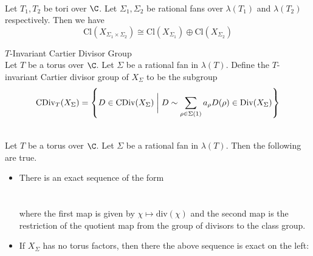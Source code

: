 \documentclass[a4paper]{article}
\begin{document}
\begin{prp}{}{}\\
Let $T_1,T_2$ be tori over $\C$. Let $\Sigma_1,\Sigma_2$ be rational fans over $\lambda(T_1)$ and $\lambda(T_2)$ respectively. Then we have $$\text{Cl}(X_{\Sigma_1\times\Sigma_2})\cong\text{Cl}(X_{\Sigma_1})\oplus\text{Cl}(X_{\Sigma_2})$$
\end{prp}

\begin{defn}{$T$-Invariant Cartier Divisor Group}{}\\
Let $T$ be a torus over $\C$. Let $\Sigma$ be a rational fan in $\lambda(T)$. Define the $T$-invariant Cartier divisor group of $X_\Sigma$ to be the subgroup $$\text{CDiv}_T(X_\Sigma)=\left\{D\in\text{CDiv}(X_\Sigma)\;\bigg{|}\;D\sim\sum_{\rho\in\Sigma(1)}a_\rho D(\rho)\in\text{Div}(X_\Sigma)\right\}$$
\end{defn}

\begin{prp}{}{}\\
Let $T$ be a torus over $\C$. Let $\Sigma$ be a rational fan in $\lambda(T)$. Then the following are true. 
\begin{itemize}
\item There is an exact sequence of the form \\~\\
\\
where the first map is given by $\chi\mapsto\text{div}(\chi)$ and the second map is the restriction of the quotient map from the group of divisors to the class group. 
\item If $X_\Sigma$ has no torus factors, then there the above sequence is exact on the left: \\~\\
\\
\end{itemize}
\end{prp}
\end{document}
